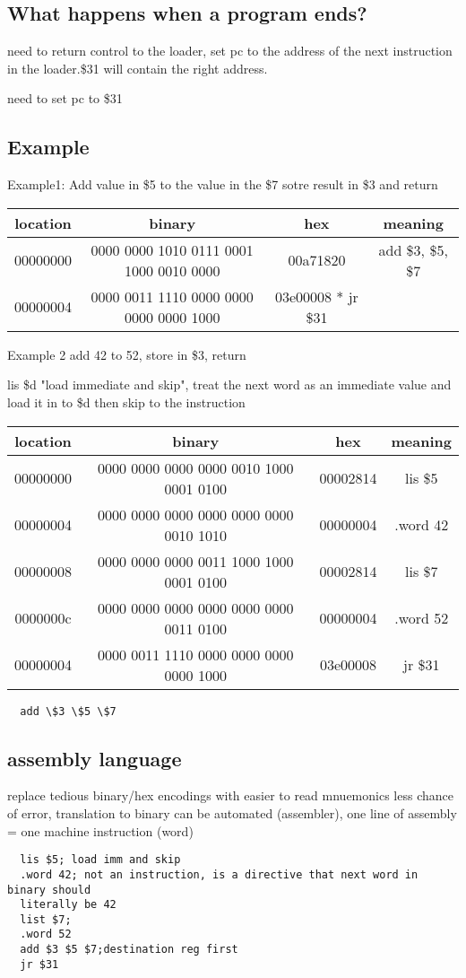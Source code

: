 \documentclass[11pt]{amsart}
\begin{document}
\subsection{What happens when a program ends?}
\par need to return control to the loader, set pc to the address of the next
instruction in the loader.\$31 will contain the right address.
\par need to set pc to \$31
\subsection{Example}
\par Example1: Add value in \$5 to the value in the \$7 sotre result in \$3 and
return\\
\begin{tabular}{|c c c c|}
  \hline
  location & binary & hex & meaning\\
  \hline
  00000000 & 0000 0000 1010 0111 0001 1000 0010 0000 & 00a71820 & add \$3, \$5,
  \$7 \\
  \hline
  00000004 & 0000 0011 1110 0000 0000 0000 0000 1000 & 03e00008 * jr \$31 \\
  \hline
\end{tabular}
\par Example 2 add 42 to 52, store in \$3, return
\par lis \$d  "load immediate and skip", treat the next word as an immediate
value and load it in to \$d then skip to the instruction\\
\begin{tabular}{|c c c c|}
  \hline
  location & binary & hex & meaning\\
  \hline
  00000000 & 0000 0000 0000 0000 0010 1000 0001 0100 & 00002814 & lis \$5\\
  \hline
  00000004 & 0000 0000 0000 0000 0000 0000 0010 1010 & 00000004 & .word 42 \\
  \hline
  00000008 & 0000 0000 0000 0011 1000 1000 0001 0100 & 00002814 & lis \$7\\
  \hline
  0000000c & 0000 0000 0000 0000 0000 0000 0011 0100 & 00000004 & .word 52 \\
  \hline
  00000004 & 0000 0011 1110 0000 0000 0000 0000 1000 & 03e00008 & jr \$31 \\
  \hline
\end{tabular}
\begin{verbatim}
  add \$3 \$5 \$7
\end{verbatim}
\subsection{assembly language}
\par replace tedious binary/hex encodings with easier to read mnuemonics
less chance of error, translation to binary can be automated (assembler), one
line of assembly = one machine instruction (word)
\begin{verbatim}
  lis $5; load imm and skip
  .word 42; not an instruction, is a directive that next word in binary should
  literally be 42
  list $7;
  .word 52
  add $3 $5 $7;destination reg first
  jr $31
\end{verbatim}
\end{document}
